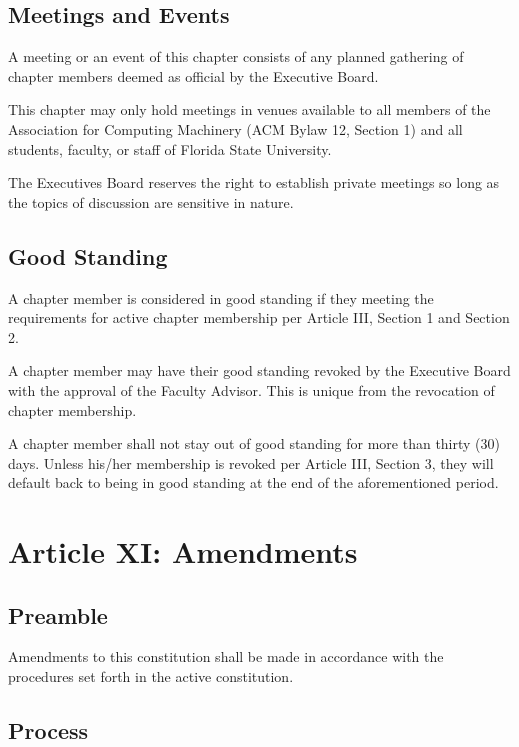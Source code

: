\documentclass{article}
\begin{document}
\subsection{Meetings and Events}

A meeting or an event of this chapter consists of any planned gathering
of chapter members deemed as official by the Executive Board.

This chapter may only hold meetings in venues available to all members
of the Association for Computing Machinery (ACM Bylaw 12, Section 1) and
all students, faculty, or staff of Florida State University.

The Executives Board reserves the right to establish private meetings so
long as the topics of discussion are sensitive in nature.

\subsection{Good Standing}

A chapter member is considered in good standing if they meeting the
requirements for active chapter membership per Article III, Section 1
and Section 2.

A chapter member may have their good standing revoked by the Executive
Board with the approval of the Faculty Advisor. This is unique from the
revocation of chapter membership.

A chapter member shall not stay out of good standing for more than
thirty (30) days. Unless his/her membership is revoked per Article III,
Section 3, they will default back to being in good standing at the end
of the aforementioned period.

\section{Article XI: Amendments}

\subsection{Preamble}

Amendments to this constitution shall be made in accordance with the
procedures set forth in the active constitution.

\subsection{Process}
\end{document}
